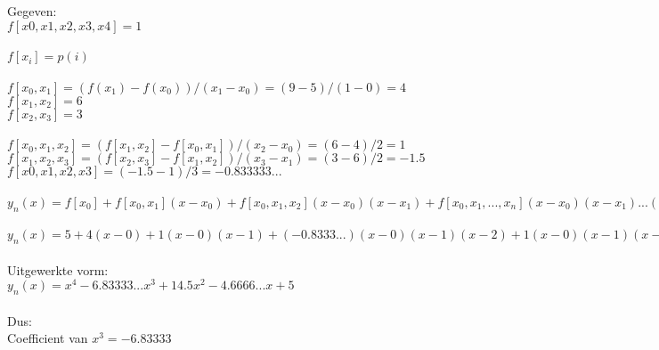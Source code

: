 Gegeven:\\
$f[x0,x1,x2,x3,x4] = 1$\\\\
$f[x_i]=p(i)$\\\\
$f[x_0,x_1] = (f(x_1)-f(x_0))/(x_1-x_0) = (9-5)/(1-0) = 4$\\
$f[x_1,x_2] = 6$\\
$f[x_2,x_3] = 3$\\\\
$f[x_0,x_1,x_2] = (f[x_1,x_2]-f[x_0,x_1])/(x_2-x_0) = (6 - 4)/2 = 1$\\
$f[x_1,x_2,x_3] = (f[x_2,x_3]-f[x_1,x_2])/(x_3-x_1) = (3 - 6)/2 = -1.5$\\
$f[x0,x1,x2,x3] = (-1.5 - 1)/3 = -0.833333...$\\\\
$y_n(x) = f[x_0] + f[x_0,x_1](x-x_0) + f[x_0,x_1,x_2](x-x_0)(x-x_1) + f[x_0,x_1,...,x_n](x-x_0)(x-x_1)...(x-x_{n-1})$\\\\
$y_n(x) = 5 + 4(x-0) + 1(x-0)(x-1) + (-0.8333...)(x-0)(x-1)(x-2) + 1(x-0)(x-1)(x-2)(x-3)$\\\\
Uitgewerkte vorm:\\
$y_n(x) = x^4 - 6.83333...x^3 + 14.5x^2 - 4.6666...x + 5$\\\\
Dus:\\
Coefficient van $x^3 = -6.83333$